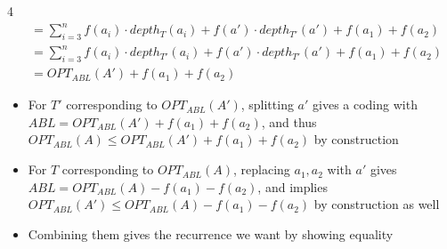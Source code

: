 \documentclass[10pt, landscape]{article}
\begin{document}
\begin{multicols*}{4}
{\begin{align*}
    &= \sum_{i=3}^n f(a_i) \cdot depth_T(a_i)+f(a') \cdot depth_{T'}(a')+f(a_1)+f(a_2) \\
    &= \sum_{i=3}^n f(a_i) \cdot depth_{T'}(a_i) + f(a') \cdot depth_{T'}(a') + f(a_1)+f(a_2) \\
    &= OPT_{ABL}(A')+f(a_1)+f(a_2)
\end{align*}
}%
\begin{itemize}
    \item For $T'$ corresponding to $OPT_{ABL}(A')$, splitting $a'$ gives a coding with $ABL=OPT_{ABL}(A')+f(a_1)+f(a_2)$, and thus $OPT_{ABL}(A)\leq OPT_{ABL}(A')+f(a_1)+f(a_2)$ by construction
    \item For $T$ corresponding to $OPT_{ABL}(A)$, replacing $a_1,a_2$ with $a'$ gives $ABL=OPT_{ABL}(A)-f(a_1)-f(a_2)$, and implies $OPT_{ABL}(A')\leq OPT_{ABL}(A)-f(a_1)-f(a_2)$ by construction as well
    \item Combining them gives the recurrence we want by showing equality
\end{itemize}

\end{multicols*}
\end{document}
